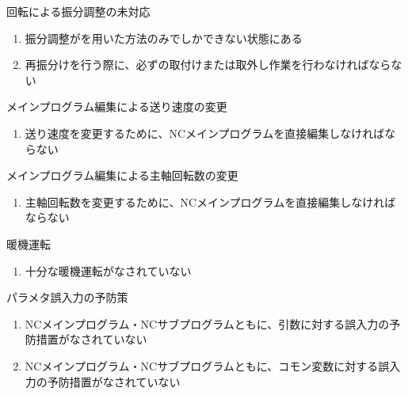 \begin{Issues}{\Table 回転による振分調整の未対応}
\begin{enumerate}[label=\sarrow]
\item[{\sarrow[red]}]振分調整が\Spacer を用いた方法のみでしかできない状態にある
\item[{\sarrow[red]}]再振分けを行う際に、必ず\Spacer の取付けまたは取外し作業を行わなければならない
\end{enumerate}
\end{Issues}

\begin{Issues}{メインプログラム編集による送り速度の変更}
\begin{enumerate}[label=\sarrow]
\item[{\sarrow[red]}]送り速度を変更するために、NCメインプログラムを直接編集しなければならない
\end{enumerate}
\end{Issues}

\begin{Issues}{メインプログラム編集による主軸回転数の変更}
\begin{enumerate}[label=\sarrow]
\item[{\sarrow[red]}]主軸回転数を変更するために、NCメインプログラムを直接編集しなければならない
\end{enumerate}
\end{Issues}


\clearpage

\begin{Issues}{暖機運転}
\begin{enumerate}[label=\sarrow]
\item[{\sarrow[red]}]十分な暖機運転がなされていない
\end{enumerate}
\end{Issues}

\begin{Issues}{パラメタ誤入力の予防策}
\begin{enumerate}[label=\sarrow]
\item[{\sarrow[red]}]NCメインプログラム・NCサブプログラムともに、引数に対する誤入力の予防措置がなされていない
\item[{\sarrow[red]}]NCメインプログラム・NCサブプログラムともに、コモン変数に対する誤入力の予防措置がなされていない
\end{enumerate}
\end{Issues}


